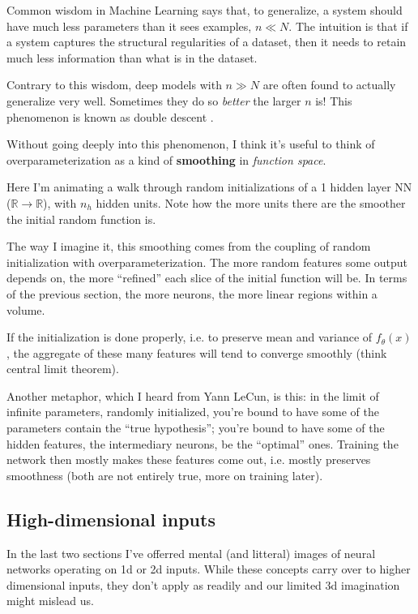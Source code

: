 Common wisdom in Machine Learning says that, to generalize, a system should have much less parameters than it sees examples, $n \ll N$. The intuition is that if a system captures the structural regularities of a dataset, then it needs to retain much less information than what is in the dataset.

Contrary to this wisdom, deep models with $n \gg N$ are often found to actually generalize very well. Sometimes they do so \emph{better} the larger $n$ is! This phenomenon is known as double descent \citep{belkin2018reconciling}.

Without going deeply into this phenomenon, I think it's useful to think of overparameterization as a kind of \textbf{smoothing} in \emph{function space}.

Here I'm animating a walk through random initializations of a 1 hidden layer NN ($\mathbb{R}\to\mathbb{R}$), with $n_h$ hidden units. Note how the more units there are the smoother the initial random function is.


The way I imagine it, this smoothing comes from the coupling of random initialization with overparameterization. The more random features some output depends on, the more ``refined'' each slice of the initial function will be. In terms of the previous section, the more neurons, the more linear regions within a volume.

If the initialization is done properly, i.e. to preserve mean and variance of $f_\theta(x)$, the aggregate of these many features will tend to converge smoothly (think central limit theorem).

Another metaphor, which I heard from Yann LeCun, is this: in the limit of infinite parameters, randomly initialized, you're bound to have some of the parameters contain the ``true hypothesis''; you're bound to have some of the hidden features, the intermediary neurons, be the ``optimal'' ones. Training the network then mostly makes these features come out, i.e. mostly preserves smoothness (both are not entirely true, more on training later).


\subsection{High-dimensional inputs}

In the last two sections I've offerred mental (and litteral) images of neural networks operating on 1d or 2d inputs. While these concepts carry over to higher dimensional inputs, they don't apply as readily and our limited 3d imagination might mislead us.

